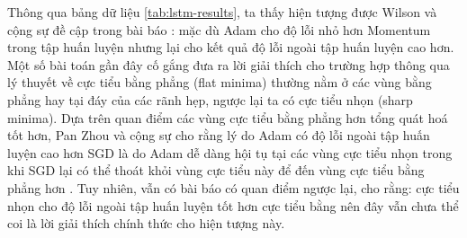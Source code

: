 Thông qua bảng dữ liệu \ref{tab:lstm-results}, ta thấy hiện tượng được Wilson và cộng sự đề cập trong bài báo \cite{wilson2017marginal}: mặc dù Adam cho độ lỗi nhỏ hơn Momentum trong tập huấn luyện nhưng lại cho kết quả độ lỗi ngoài tập huấn luyện cao hơn. Một số bài toán gần đây cố gắng đưa ra lời giải thích cho trường hợp thông qua lý thuyết về cực tiểu bằng phẳng (flat minima) thường nằm ở các vùng bằng phẳng hay tại đáy của các rãnh hẹp, ngược lại ta có cực tiểu nhọn (sharp minima). Dựa trên quan điểm các vùng cực tiểu bằng phẳng hơn tổng quát hoá tốt hơn, Pan Zhou và cộng sự cho rằng lý do Adam có độ lỗi ngoài tập huấn luyện cao hơn SGD là do Adam dễ dàng hội tụ tại các vùng cực tiểu nhọn trong khi SGD lại có thể thoát khỏi vùng cực tiểu này để đến vùng cực tiểu bằng phẳng hơn \cite{zhou2020towards}. Tuy nhiên, vẫn có bài báo có quan điểm ngược lại, cho rằng: cực tiểu nhọn cho độ lỗi ngoài tập huấn luyện tốt hơn cực tiểu bằng \cite{li2018visualizing} nên đây vẫn chưa thể coi là lời giải thích chính thức cho hiện tượng này.